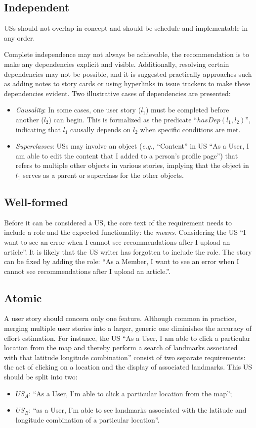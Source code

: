 \subsection*{\normalsize{Independent}}
USs should not overlap in concept and should be schedule and implementable in any order. 

Complete independence may not always be achievable, the recommendation is to make any dependencies explicit and visible. Additionally, resolving certain dependencies may not be possible, and it is suggested practically approaches such as adding notes to story cards or using hyperlinks in issue trackers to make these dependencies evident. Two illustrative cases of dependencies are presented:
\begin{itemize}
\item 	\emph{Causality}: In some cases, one user story ($l_1$) must be completed before another ($l_2$) can begin. This is formalized as the predicate \enquote{$hasDep(l_1, l_2)$}, indicating that $ l_1$ causally depends on $l_2$ when specific conditions are met.
\item 	\emph{Superclasses}: USs may involve an object (\emph{e.g.}, \enquote{Content} in US \enquote{As a User, I am able to edit the content that I added to a person’s profile page}) that refers to multiple other objects in various stories, implying that the object in $l_1$ serves as a parent or superclass for the other objects.
\end{itemize}
\subsection*{\normalsize{Well-formed}}
Before it can be considered a US, the core text of the requirement needs to include a role and the expected functionality: the \emph{means}. Considering the US \enquote{I want to see an error when I cannot see recommendations after I upload an article}. It is likely that the US writer has forgotten to include the role. The story can be fixed by adding the role: \enquote{As a Member, I want to see an error when I cannot see recommendations after I upload an article.}.
\subsection*{\normalsize{Atomic}}
A user story should concern only one feature. Although common in practice, merging multiple user stories into a larger, generic one diminishes the accuracy of effort estimation\cite{liskin2014we}. For instance, the US \enquote{As a User, I am able to click a particular location from the map and thereby perform a search of landmarks associated with that latitude longitude combination} consist of two separate requirements: the act of clicking on a location and the display of associated landmarks. This US should be split into two:
\begin{itemize}
\item $US_A$: \enquote{As a User, I’m able to click a particular location from the map};
\item $US_B$: \enquote{as a User, I’m able to see landmarks associated with the latitude and longitude combination of a particular location}.
\end{itemize}
